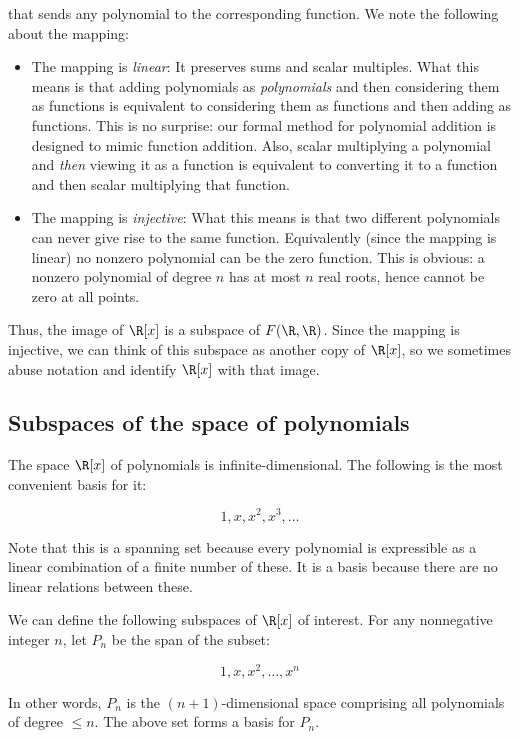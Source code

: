 \documentclass[10pt]{amsart}
\begin{document}
that sends any polynomial to the corresponding function. We note the
following about the mapping:

\begin{itemize}
\item The mapping is {\em linear}: It preserves sums and scalar
  multiples. What this means is that adding polynomials as {\em
    polynomials} and then considering them as functions is equivalent
  to considering them as functions and then adding as functions. This
  is no surprise: our formal method for polynomial addition is
  designed to mimic function addition. Also, scalar multiplying a
  polynomial and {\em then} viewing it as a function is equivalent to
  converting it to a function and then scalar multiplying that function.
\item The mapping is {\em injective}: What this means is that two
  different polynomials can never give rise to the same
  function. Equivalently (since the mapping is linear) no nonzero
  polynomial can be the zero function. This is obvious: a nonzero
  polynomial of degree $n$ has at most $n$ real roots, hence cannot be
  zero at all points.
\end{itemize}

Thus, the image of $\R[x]$ is a subspace of $F(\R,\R)$. Since the
mapping is injective, we can think of this subspace as another copy of
$\R[x]$, so we sometimes abuse notation and identify $\R[x]$ with that image.

\subsection{Subspaces of the space of polynomials}

The space $\R[x]$ of polynomials is infinite-dimensional. The
following is the most convenient basis for it:

$$1,x,x^2,x^3,\dots$$

Note that this is a spanning set because every polynomial is
expressible as a linear combination of a finite number of these. It is
a basis because there are no linear relations between these.

We can define the following subspaces of $\R[x]$ of interest. For any
nonnegative integer $n$, let $P_n$ be the span of the subset:

$$1,x,x^2,\dots,x^n$$

In other words, $P_n$ is the $(n+1)$-dimensional space comprising all
polynomials of degree $\le n$. The above set forms a basis for $P_n$.
\end{document}
